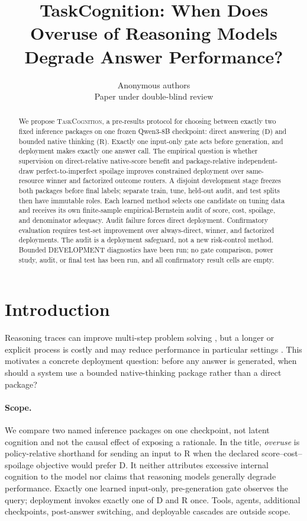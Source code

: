 \documentclass{article}
\title{TaskCognition: When Does Overuse of Reasoning Models Degrade Answer Performance?}
\author{Anonymous authors\\Paper under double-blind review}
\newcommand{\TC}{\textsc{TaskCognition}}
\newcommand{\D}{\ensuremath{\mathrm{D}}}
\newcommand{\Rpol}{\ensuremath{\mathrm{R}}}
\newcommand{\1}{\mathbb{I}}
\begin{document}
\maketitle

\begin{abstract}
We propose \TC{}, a pre-results protocol for choosing between exactly two fixed inference packages on one frozen Qwen3-8B checkpoint: direct answering (\D) and bounded native thinking (\Rpol). Exactly one input-only gate acts before generation, and deployment makes exactly one answer call. The empirical question is whether supervision on direct-relative native-score benefit and package-relative independent-draw perfect-to-imperfect spoilage improves constrained deployment over same-resource winner and factorized outcome routers. A disjoint development stage freezes both packages before final labels; separate train, tune, held-out audit, and test splits then have immutable roles. Each learned method selects one candidate on tuning data and receives its own finite-sample empirical-Bernstein audit of score, cost, spoilage, and denominator adequacy. Audit failure forces direct deployment. Confirmatory evaluation requires test-set improvement over always-direct, winner, and factorized deployments. The audit is a deployment safeguard, not a new risk-control method. Bounded DEVELOPMENT diagnostics have been run; no gate comparison, power study, audit, or final test has been run, and all confirmatory result cells are empty.
\end{abstract}

\section{Introduction}
Reasoning traces can improve multi-step problem solving \citep{wei2022chain}, but a longer or explicit process is costly and may reduce performance in particular settings \citep{pmlr-v267-liu25t,wu2026more,srivastava-etal-2026-llms}. This motivates a concrete deployment question: before any answer is generated, when should a system use a bounded native-thinking package rather than a direct package?

\paragraph{Scope.}
We compare two named inference packages on one checkpoint, not latent cognition and not the causal effect of exposing a rationale. In the title, \emph{overuse} is policy-relative shorthand for sending an input to \Rpol{} when the declared score--cost--spoilage objective would prefer \D. It neither attributes excessive internal cognition to the model nor claims that reasoning models generally degrade performance. Exactly one learned input-only, pre-generation gate observes the query; deployment invokes exactly one of \D{} and \Rpol{} once. Tools, agents, additional checkpoints, post-answer switching, and deployable cascades are outside scope.
\end{document}
